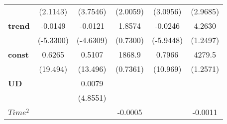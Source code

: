 \documentclass{article}
\begin{document}
\begin{table}[!htbp]
\begin{center}
{\begin{tabular}{lccccc}
\textbf{ }                     &   (2.1143)   &        (3.7546)       &     (2.0059)     &      (3.0956)     &        (2.9685)        \\
\textbf{trend}                 &   -0.0149    &        -0.0121        &      1.8574      &      -0.0246      &         4.2630         \\
\textbf{ }                     &  (-5.3300)   &       (-4.6309)       &     (0.7300)     &     (-5.9448)     &        (1.2497)        \\
\textbf{const}                 &    0.6265    &         0.5107        &      1868.9      &       0.7966      &         4279.5         \\
\textbf{ }                     &   (19.494)   &        (13.496)       &     (0.7361)     &      (10.969)     &        (1.2571)        \\
\textbf{UD}                    &              &         0.0079        &                  &                   &                        \\
\textbf{ }                     &              &        (4.8551)       &                  &                   &                        \\
\textbf{$Time^2$}             &              &                       &     -0.0005      &                   &        -0.0011         \\
\bottomrule

\end{tabular}}
\end{center}
\end{table}
\end{document}
